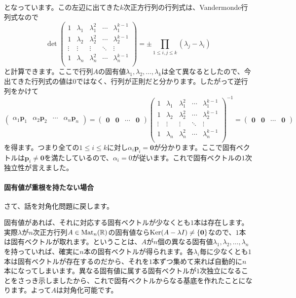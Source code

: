 となっています。この左辺に出てきた$k$次正方行列の行列式は、Vandermonde行列式なので
\[
\det
\begin{pmatrix}
1 & \lambda_1 & \lambda_1^2 & \cdots & \lambda_1^{k - 1} \\
1 & \lambda_2 & \lambda_2^2 & \cdots & \lambda_2^{k - 1} \\
\vdots & \vdots & \vdots & \ddots & \vdots \\
1 & \lambda_n & \lambda_n^2 & \cdots & \lambda_n^{k - 1} \\
\end{pmatrix}
=
\pm \prod_{1 \leq i, j \leq k} (\lambda_j - \lambda_i)
\]
と計算できます。ここで行列$A$の固有値$\lambda_1, \lambda_2, \ldots, \lambda_k$は全て異なるとしたので、今出てきた行列式の値は$0$ではなく、行列が正則だと分かります。したがって逆行列をかけて
\[
\begin{pmatrix}
\alpha_1 \bm{p}_1 & \alpha_2 \bm{p}_2 & \cdots & \alpha_n \bm{p}_n
\end{pmatrix}
=
\begin{pmatrix}
\bm{0} & \bm{0} & \cdots & \bm{0}
\end{pmatrix}
\begin{pmatrix}
1 & \lambda_1 & \lambda_1^2 & \cdots & \lambda_1^{k - 1} \\
1 & \lambda_2 & \lambda_2^2 & \cdots & \lambda_2^{k - 1} \\
\vdots & \vdots & \vdots & \ddots & \vdots \\
1 & \lambda_n & \lambda_n^2 & \cdots & \lambda_n^{k - 1} \\
\end{pmatrix}^{-1}
=
\begin{pmatrix}
\bm{0} & \bm{0} & \cdots & \bm{0}
\end{pmatrix}
\]
を得ます。つまり全ての$1 \leq i \leq k$に対し$\alpha_i \bm{p}_i = \bm{0}$が分かります。ここで固有ベクトルは$\bm{p}_i \neq \bm{0}$を満たしているので、$\alpha_i = 0$が従います。これで固有ベクトルの$1$次独立性が言えました。

\paragraph{固有値が重根を持たない場合}

さて、話を対角化問題に戻します。

固有値があれば、それに対応する固有ベクトルが少なくとも$1$本は存在します。実際$\lambda$が$n$次正方行列$A \in \operatorname{Mat}_n(\mathbb{R})$の固有値なら$\operatorname{Ker} (A - \lambda I) \neq \{\boldsymbol{0}\}$なので、$1$本は固有ベクトルが取れます。ということは、$A$が$n$個の異なる固有値$\lambda_1, \lambda_2, \ldots, \lambda_n$を持っていれば、確実に$n$本の固有ベクトルが得られます。各$\lambda_i$毎に少なくとも$1$本は固有ベクトルが存在するのだから、それを$1$本ずつ集めて来れば自動的に$n$本になってしまいます。異なる固有値に属する固有ベクトルが$1$次独立になることをさっき示しましたから、これで固有ベクトルからなる基底を作れたことになります。よって$A$は対角化可能です。

